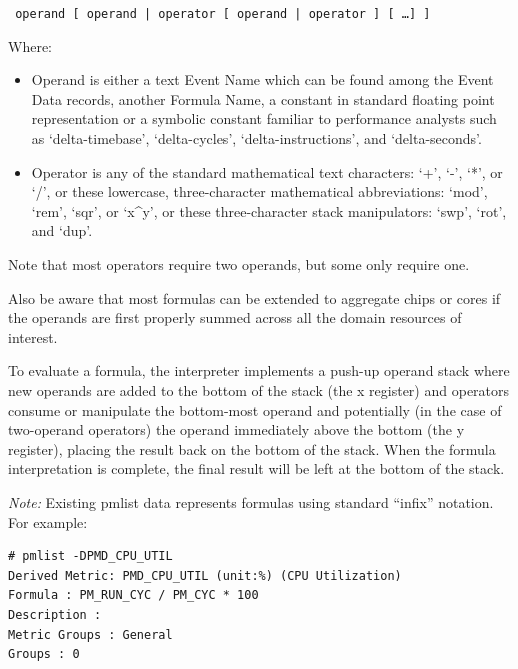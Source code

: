 \documentclass[14]{article}
\begin{document}
\begin{center}
  \texttt{
    operand [ operand | operator [ operand | operator ] [ \dots ] ]
  }
\end{center}

Where:
\begin{itemize}
\item Operand is either a text Event Name which can be found among the Event
  Data records, another Formula Name, a constant in standard floating point
  representation or a symbolic constant familiar to performance analysts such as
  `delta-timebase', `delta-cycles', `delta-instructions', and `delta-seconds'.
\item Operator is any of the standard mathematical text characters: `+', `-',
  `*', or `/', or these lowercase, three-character mathematical abbreviations:
  `mod', `rem', `sqr', or `x\^{}y', or these three-character stack manipulators:
  `swp', `rot', and `dup'.

\end{itemize}
Note that most operators require two operands, but some only require one.

Also be aware that most formulas can be extended to aggregate chips or cores if
the operands are first properly summed across all the domain resources of
interest.

To evaluate a formula, the interpreter implements a push-up operand stack where
new operands are added to the bottom of the stack (the x register) and operators
consume or manipulate the bottom-most operand and potentially (in the case of
two-operand operators) the operand immediately above the bottom (the y
register), placing the result back on the bottom of the stack. When the formula
interpretation is complete, the final result will be left at the bottom of the
stack.

\textit{Note:} Existing pmlist data represents formulas using standard ``infix''
notation. For example:

\begin{verbatim}
# pmlist -DPMD_CPU_UTIL
Derived Metric: PMD_CPU_UTIL (unit:%) (CPU Utilization)
Formula : PM_RUN_CYC / PM_CYC * 100
Description :
Metric Groups : General
Groups : 0
\end{verbatim}
\end{document}
